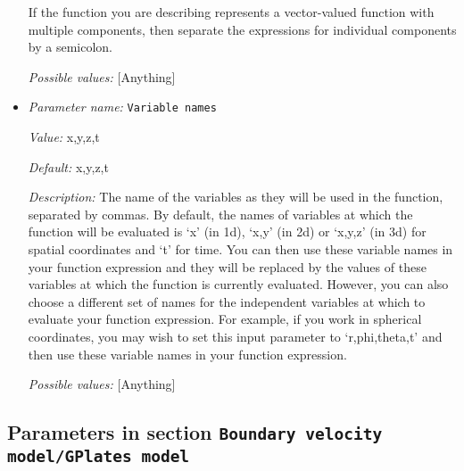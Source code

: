 \begin{itemize}
If the function you are describing represents a vector-valued function with multiple components, then separate the expressions for individual components by a semicolon.


{\it Possible values:} [Anything]
\item {\it Parameter name:} {\tt Variable names}


{\it Value:} x,y,z,t


{\it Default:} x,y,z,t


{\it Description:} The name of the variables as they will be used in the function, separated by commas. By default, the names of variables at which the function will be evaluated is `x' (in 1d), `x,y' (in 2d) or `x,y,z' (in 3d) for spatial coordinates and `t' for time. You can then use these variable names in your function expression and they will be replaced by the values of these variables at which the function is currently evaluated. However, you can also choose a different set of names for the independent variables at which to evaluate your function expression. For example, if you work in spherical coordinates, you may wish to set this input parameter to `r,phi,theta,t' and then use these variable names in your function expression.


{\it Possible values:} [Anything]
\end{itemize}

\subsection{Parameters in section \tt Boundary velocity model/GPlates model}
\label{parameters:Boundary_20velocity_20model/GPlates_20model}

